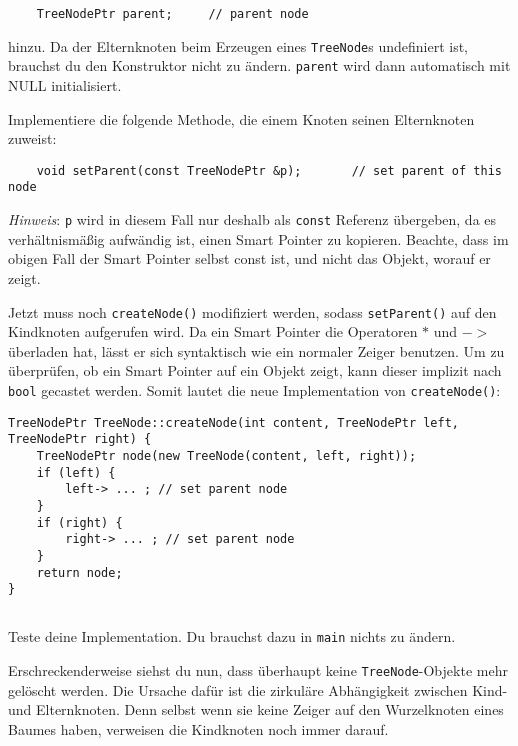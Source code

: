 \begin{lstlisting}
	TreeNodePtr parent;		// parent node
\end{lstlisting}

hinzu.
Da der Elternknoten beim Erzeugen eines \texttt{TreeNode}s undefiniert ist, brauchst du den Konstruktor nicht zu ändern. \texttt{parent} wird dann automatisch mit NULL initialisiert.

Implementiere die folgende Methode, die einem Knoten seinen Elternknoten zuweist:

\begin{lstlisting}
	void setParent(const TreeNodePtr &p);		// set parent of this node
\end{lstlisting}

\emph{Hinweis}:
\texttt{p} wird in diesem Fall nur deshalb als \texttt{const} Referenz übergeben, da es verhältnismäßig aufwändig ist, einen Smart Pointer zu kopieren.
Beachte, dass im obigen Fall der Smart Pointer selbst const ist, und nicht das Objekt, worauf er zeigt.

Jetzt muss noch \texttt{createNode()} modifiziert werden, sodass \texttt{setParent()} auf den Kindknoten aufgerufen wird. Da ein Smart Pointer die Operatoren $*$ und $->$ überladen hat, lässt er sich syntaktisch wie ein normaler Zeiger benutzen. Um zu überprüfen, ob ein Smart Pointer auf ein Objekt zeigt, kann dieser implizit nach \texttt{bool} gecastet werden. Somit lautet die neue Implementation von \texttt{createNode()}:

\begin{lstlisting}
TreeNodePtr TreeNode::createNode(int content, TreeNodePtr left, TreeNodePtr right) {
	TreeNodePtr node(new TreeNode(content, left, right));
	if (left) {
		left-> ... ; // set parent node
	}
	if (right) {
		right-> ... ; // set parent node
	}
	return node;
}
\end{lstlisting}

\subsection{}
Teste deine Implementation.
Du brauchst dazu in \texttt{main} nichts zu ändern.

Erschreckenderweise siehst du nun, dass überhaupt keine \texttt{TreeNode}-Objekte mehr gelöscht werden.
Die Ursache dafür ist die zirkuläre Abhängigkeit zwischen Kind- und Elternknoten.
Denn selbst wenn sie keine Zeiger auf den Wurzelknoten eines Baumes haben, verweisen die Kindknoten noch immer darauf.


